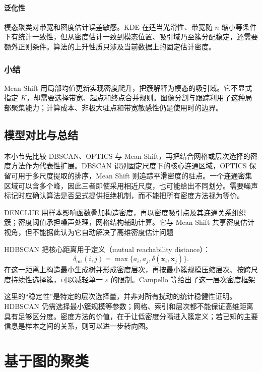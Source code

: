 \paragraph{泛化性}
模态聚类对带宽和密度估计误差敏感。KDE 在适当光滑性、带宽随 $n$ 缩小等条件下有统计一致性，但从密度估计一致到模态位置、吸引域乃至簇分配稳定，还需要额外正则条件。算法的上升性质只涉及当前数据上的固定估计密度。

\subsubsection{小结}

Mean Shift 用局部均值更新实现密度爬升，把簇解释为模态的吸引域。它不显式指定 $K$，却需要选择带宽、起点和终点合并规则。图像分割与跟踪利用了这种局部聚集能力；计算成本、非极大驻点和带宽敏感性仍是使用时的边界。

\subsection{模型对比与总结}

本小节先比较 DBSCAN、OPTICS 与 Mean Shift，再把结合网格或层次选择的密度方法作为代表性扩展。DBSCAN 识别固定尺度下的核心连通区域，OPTICS 保留可用于多尺度提取的排序，Mean Shift 则追踪平滑密度的驻点。一个连通密集区域可以含多个峰，因此三者即使采用相近尺度，也可能给出不同划分。需要噪声标记时应确认算法是否显式提供拒绝机制，而不能把所有密度方法视为等价。

DENCLUE 用样本影响函数叠加构造密度，再以密度吸引点及其连通关系组织簇；密度阈值承担噪声处理，网格结构辅助计算。它与 Mean Shift 共享密度估计视角，但不能据此认为它自动解决了高维密度估计问题

HDBSCAN 把核心距离用于定义（mutual reachability distance）：
\[
 \delta_{\mathrm{mr}}(i,j)
 =\max\{a_i,a_j,\delta(\bm{x}_i,\bm{x}_j)\}.
\]
在这一距离上构造最小生成树并形成密度层次，再按最小簇规模压缩层次、按跨尺度持续性选择簇，可以减轻单一 $\varepsilon$ 的限制。Campello 等给出了这一层次密度框架

这里的“稳定性”是特定的层次选择量，并非对所有扰动的统计稳健性证明。HDBSCAN 仍需选择最小簇规模等参数；网格、索引和层次都不能保证高维距离具有足够区分度。密度方法的价值，在于让低密度分隔进入簇定义；若已知的主要信息是样本之间的关系，则可以进一步转向图。

\section{基于图的聚类}
\label{sec:clustering-graph}

